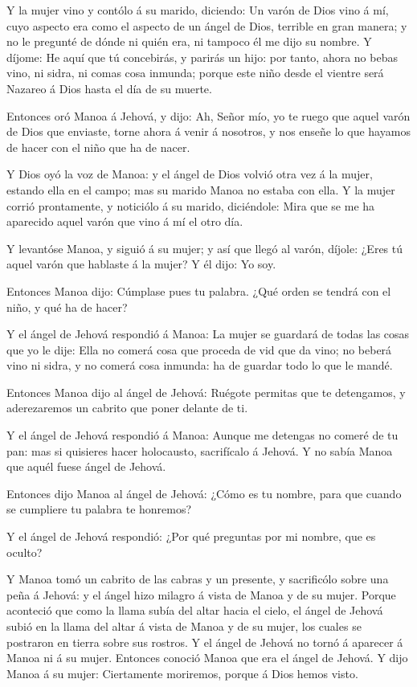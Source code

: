  Y la mujer vino y contólo á su marido, diciendo: Un varón
de Dios vino á mí, cuyo aspecto era como el aspecto de un ángel de Dios,
terrible en gran manera; y no le pregunté de dónde ni quién era, ni
tampoco él me dijo su nombre.  Y díjome: He aquí que tú
concebirás, y parirás un hijo: por tanto, ahora no bebas vino, ni sidra,
ni comas cosa inmunda; porque este niño desde el vientre será Nazareo á
Dios hasta el día de su muerte.

 Entonces oró Manoa á Jehová, y dijo: Ah, Señor mío, yo te
ruego que aquel varón de Dios que enviaste, torne ahora á venir á
nosotros, y nos enseñe lo que hayamos de hacer con el niño que ha de
nacer.

 Y Dios oyó la voz de Manoa: y el ángel de Dios volvió
otra vez á la mujer, estando ella en el campo; mas su marido Manoa no
estaba con ella.  Y la mujer corrió prontamente, y
noticiólo á su marido, diciéndole: Mira que se me ha aparecido aquel
varón que vino á mí el otro día.

 Y levantóse Manoa, y siguió á su mujer; y así que llegó
al varón, díjole: ¿Eres tú aquel varón que hablaste á la mujer? Y él
dijo: Yo soy.

 Entonces Manoa dijo: Cúmplase pues tu palabra. ¿Qué
orden se tendrá con el niño, y qué ha de hacer?

 Y el ángel de Jehová respondió á Manoa: La mujer se
guardará de todas las cosas que yo le dije:  Ella no
comerá cosa que proceda de vid que da vino; no beberá vino ni sidra, y
no comerá cosa inmunda: ha de guardar todo lo que le mandé.

 Entonces Manoa dijo al ángel de Jehová: Ruégote permitas
que te detengamos, y aderezaremos un cabrito que poner delante de ti.

 Y el ángel de Jehová respondió á Manoa: Aunque me
detengas no comeré de tu pan: mas si quisieres hacer holocausto,
sacrifícalo á Jehová. Y no sabía Manoa que aquél fuese ángel de Jehová.

 Entonces dijo Manoa al ángel de Jehová: ¿Cómo es tu
nombre, para que cuando se cumpliere tu palabra te honremos?

 Y el ángel de Jehová respondió: ¿Por qué preguntas por
mi nombre, que es oculto?

 Y Manoa tomó un cabrito de las cabras y un presente, y
sacrificólo sobre una peña á Jehová: y el ángel hizo milagro á vista de
Manoa y de su mujer.  Porque aconteció que como la llama
subía del altar hacia el cielo, el ángel de Jehová subió en la llama del
altar á vista de Manoa y de su mujer, los cuales se postraron en tierra
sobre sus rostros.  Y el ángel de Jehová no tornó á
aparecer á Manoa ni á su mujer. Entonces conoció Manoa que era el ángel
de Jehová.  Y dijo Manoa á su mujer: Ciertamente
moriremos, porque á Dios hemos visto.

